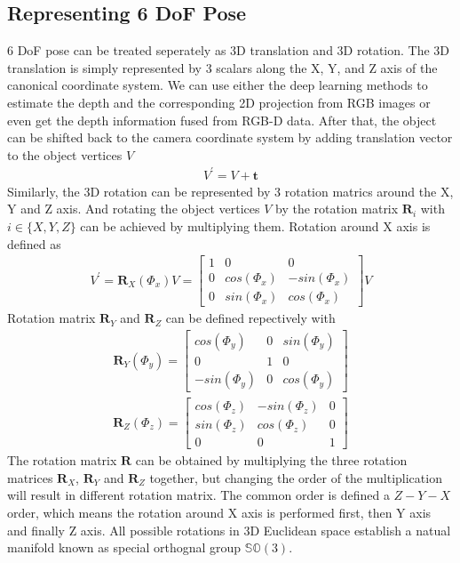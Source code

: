 \documentclass[12pt,DIV14,BCOR12mm,a4paper,footinclude=false,headinclude,parskip=half-,twoside,openright,cleardoublepage=empty,toc=index,bibliography=totoc,listof=totoc]{scrreprt}
\numberwithin{equation}{chapter}
\begin{document}
\subsection{Representing 6 DoF Pose}\label{sec:representation}
6 DoF pose can be treated seperately as 3D translation and 3D rotation. The 3D translation is simply represented by 3 scalars along the X, Y, and Z axis of the canonical coordinate system. 
We can use either the deep learning methods to estimate the depth and the corresponding 2D projection from RGB images or even get the depth information fused from RGB-D data\cite{DBLP:journals/corr/abs-1711-00199}. After that, the object can be shifted back to the camera coordinate system by adding translation vector to the object vertices $V$
\begin{align}
  V^{'} = V + \mathbf{t}
\end{align}
Similarly, the 3D rotation can be represented by 3 rotation matrics around the X, Y and Z axis. And rotating the object vertices $V$ by the rotation matrix $\mathbf{R}_{i}$ with $i\in \{X,Y,Z\}$ can be achieved by multiplying them. Rotation around X axis is defined as
\begin{align}
  V^{'} = \mathbf{R}_{X}(\Phi_{x})V = \begin{bmatrix}
    1 & 0 & 0 \\
    0 & cos(\Phi_{x}) & -sin(\Phi_{x}) \\
    0 & sin(\Phi_{x}) & cos(\Phi_{x})
  \end{bmatrix}V
\end{align}
Rotation matrix $\mathbf{R}_{Y}$ and $\mathbf{R}_{Z}$ can be defined repectively with
\begin{align}
  \mathbf{R}_{Y}(\Phi_{y}) = \begin{bmatrix}
    cos(\Phi_{y}) & 0 & sin(\Phi_{y}) \\
    0 & 1 & 0 \\
    -sin(\Phi_{y}) & 0 & cos(\Phi_{y})
  \end{bmatrix}
\end{align}
\begin{align}
  \mathbf{R}_{Z}(\Phi_{z}) = \begin{bmatrix}
    cos(\Phi_{z}) & -sin(\Phi_{z}) & 0 \\
    sin(\Phi_{z}) & cos(\Phi_{z}) & 0 \\
    0 & 0 & 1
  \end{bmatrix}
\end{align}
The rotation matrix $\mathbf{R}$ can be obtained by multiplying the three rotation matrices $\mathbf{R}_{X}$, $\mathbf{R}_{Y}$ and $\mathbf{R}_{Z}$ together, but changing the order of the multiplication will result in different rotation matrix. The common order is defined a $Z-Y-X$ order, which means the rotation around X axis is performed first, then Y axis and finally Z axis. All possible rotations in 3D Euclidean space establish a natual manifold known as special orthognal group $\mathbb{S} \mathbb{O} (3)$\cite{hashim2019special}.
\end{document}
